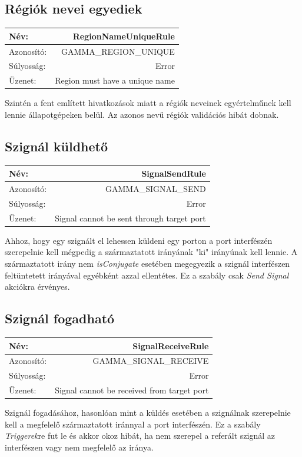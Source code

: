 \subsection{Régiók nevei egyediek}

\begin{tabular}{ | l | r | }
	\hline
	Név: & RegionNameUniqueRule  \\ 
	\hline
	Azonosító: & GAMMA\_REGION\_UNIQUE \\
	\hline
	Súlyosság: & Error \\  
	\hline
	Üzenet: & Region must have a unique name \\
	\hline
\end{tabular}\newline
\newline
Szintén a fent említett hivatkozások miatt a régiók neveinek egyértelműnek kell lennie állapotgépeken belül. Az azonos nevű régiók validációs hibát dobnak.

\subsection{Szignál küldhető}

\begin{tabular}{ | l | r | }
	\hline
	Név: & SignalSendRule  \\ 
	\hline
	Azonosító: & GAMMA\_SIGNAL\_SEND \\
	\hline
	Súlyosság: & Error \\  
	\hline
	Üzenet: & Signal cannot be sent through target port \\
	\hline
\end{tabular}\newline
\newline
Ahhoz, hogy egy szignált el lehessen küldeni egy porton a port interfészén szerepelnie kell mégpedig a származtatott irányának "ki" irányúnak kell lennie. A származtatott irány nem \emph{isConjugate} esetében megegyezik a szignál interfészen feltüntetett irányával egyébként azzal ellentétes. Ez a szabály csak \emph{Send Signal} akciókra érvényes.

\subsection{Szignál fogadható}

\begin{tabular}{ | l | r | }
	\hline
	Név: & SignalReceiveRule  \\ 
	\hline
	Azonosító: & GAMMA\_SIGNAL\_RECEIVE \\
	\hline
	Súlyosság: & Error \\  
	\hline
	Üzenet: & Signal cannot be received from target port \\
	\hline
\end{tabular}\newline
\newline
Szignál fogadásához, hasonlóan mint a küldés esetében a szignálnak szerepelnie kell a megfelelő származtatott iránnyal a port interfészén. Ez a szabály \emph{Triggerek}re fut le és akkor okoz hibát, ha nem szerepel a referált szignál az interfészen vagy nem megfelelő az iránya.

